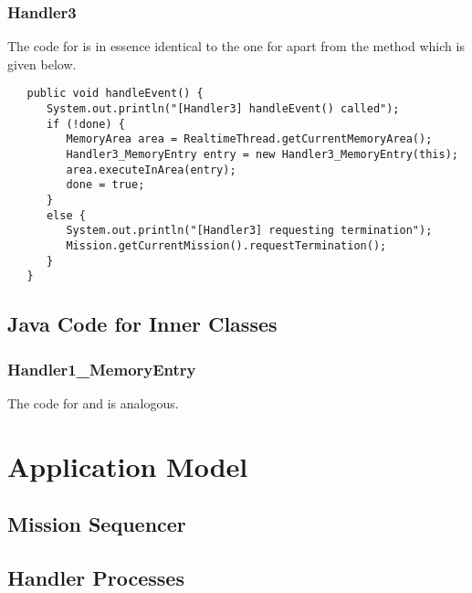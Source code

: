 \documentclass{article}
\begin{document}
\subsubsection{Handler3}

The code for  is in essence identical to the one for  apart from the  method which is given below.

\begin{verbatim}
   public void handleEvent() {
      System.out.println("[Handler3] handleEvent() called");
      if (!done) {
         MemoryArea area = RealtimeThread.getCurrentMemoryArea();
         Handler3_MemoryEntry entry = new Handler3_MemoryEntry(this);
         area.executeInArea(entry);
         done = true;
      }
      else {
         System.out.println("[Handler3] requesting termination");
         Mission.getCurrentMission().requestTermination();         
      }
   }
\end{verbatim}

\subsection{Java Code for Inner Classes}

\subsubsection{Handler1\_MemoryEntry}


\nid The code for  and  is analogous.


\section{Application Model}

\subsection{Mission Sequencer}
\vspace{-0.5em}

\begin{circusbox}

\end{circusbox}

\subsection{Handler Processes}
\vspace{-0.5em}
\end{document}
